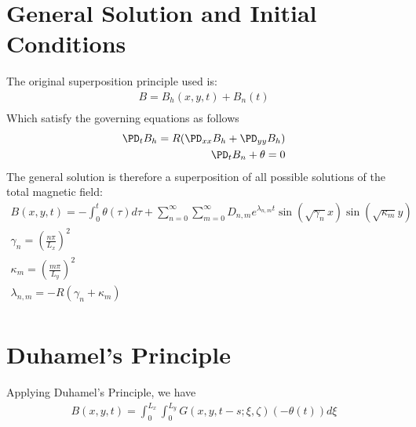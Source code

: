 \documentclass[11pt]{article}
\begin{document}
\section{General Solution and Initial Conditions}
The original superposition principle used is:
\begin{equation}\begin{aligned}
B = B_h(x,y,t) + B_n(t) \\
\end{aligned} \end{equation}
Which satisfy the governing equations as follows
\begin{equation}\begin{aligned}
\PD_t B_h = R (\PD_{xx} B_h + \PD_{yy} B_h) \\
\PD_t B_n + \theta = 0 \\
\end{aligned} \end{equation}
The general solution is therefore a superposition of all possible solutions of the total magnetic field:
\begin{equation}\begin{aligned}
B(x,y,t) = - \int_0^t \theta(\tau) d\tau +
\sum_{n=0}^{\infty} \sum_{m=0}^{\infty}
D_{n,m} e^{\lambda_{n,m} t} \sin(\sqrt{\gamma_n} x) \sin(\sqrt{\kappa_{m}} y)
 \\
 \gamma_n = \left( \frac{n\pi}{L_x} \right)^2 \\
 \kappa_{m} = \left( \frac{m\pi}{L_y} \right)^2 \\
 \lambda_{n,m} = - R \left( \gamma_n + \kappa_{m} \right) \\
\end{aligned} \end{equation}

\section{Duhamel's Principle}
Applying Duhamel's Principle, we have
\begin{equation}\begin{aligned}
B(x,y,t) = \int_{0}^{L_x} \int_{0}^{L_y} G(x,y,t-s;\xi,\zeta) (-\theta(t)) d\xi \\
\end{aligned} \end{equation}
\end{document}
